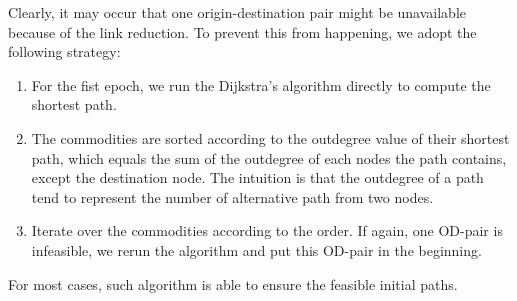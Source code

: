 Clearly, it may occur that one origin-destination pair might be unavailable because of the link reduction. To prevent this from happening, we adopt the following strategy:
\begin{enumerate}
    \item For the fist epoch, we run the Dijkstra's algorithm directly to compute the shortest path. 
    \item The commodities are sorted according to the outdegree value of their shortest path, which equals the sum of the outdegree of each nodes the path contains, except the destination node. The intuition is that the outdegree of a path tend to represent the number of alternative path from two nodes.
    \item Iterate over the commodities according to the order. If again, one OD-pair is infeasible, we rerun the algorithm and put this OD-pair in the beginning.
\end{enumerate}

For most cases, such algorithm is able to ensure the feasible initial paths.













